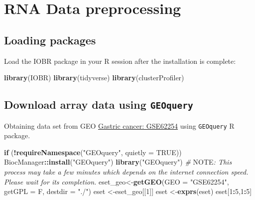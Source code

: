 \documentclass[
  12pt,
]{book}
\newenvironment{Shaded}{\begin{snugshade}}{\end{snugshade}}
\newcommand{\AlertTok}[1]{\textcolor[rgb]{0.94,0.16,0.16}{#1}}
\newcommand{\AttributeTok}[1]{\textcolor[rgb]{0.13,0.29,0.53}{#1}}
\newcommand{\CommentTok}[1]{\textcolor[rgb]{0.56,0.35,0.01}{\textit{#1}}}
\newcommand{\ConstantTok}[1]{\textcolor[rgb]{0.56,0.35,0.01}{#1}}
\newcommand{\ControlFlowTok}[1]{\textcolor[rgb]{0.13,0.29,0.53}{\textbf{#1}}}
\newcommand{\DecValTok}[1]{\textcolor[rgb]{0.00,0.00,0.81}{#1}}
\newcommand{\FunctionTok}[1]{\textcolor[rgb]{0.13,0.29,0.53}{\textbf{#1}}}
\newcommand{\NormalTok}[1]{#1}
\newcommand{\OtherTok}[1]{\textcolor[rgb]{0.56,0.35,0.01}{#1}}
\newcommand{\SpecialCharTok}[1]{\textcolor[rgb]{0.81,0.36,0.00}{\textbf{#1}}}
\newcommand{\StringTok}[1]{\textcolor[rgb]{0.31,0.60,0.02}{#1}}
\begin{document}
\hypertarget{rna-data-preprocessing}{%
\chapter{\texorpdfstring{\textbf{RNA Data preprocessing}}{RNA Data preprocessing}}\label{rna-data-preprocessing}}

\hypertarget{loading-packages}{%
\section{Loading packages}\label{loading-packages}}

Load the IOBR package in your R session after the installation is complete:

\begin{Shaded}
\begin{Highlighting}[]
\FunctionTok{library}\NormalTok{(IOBR)}
\FunctionTok{library}\NormalTok{(tidyverse)}
\FunctionTok{library}\NormalTok{(clusterProfiler)}
\end{Highlighting}
\end{Shaded}

\hypertarget{download-array-data-using-geoquery}{%
\section{\texorpdfstring{Download array data using \texttt{GEOquery}}{Download array data using GEOquery}}\label{download-array-data-using-geoquery}}

Obtaining data set from GEO \href{https://pubmed.ncbi.nlm.nih.gov/25894828/}{Gastric cancer: GSE62254} using \texttt{GEOquery} R package.

\begin{Shaded}
\begin{Highlighting}[]
\ControlFlowTok{if}\NormalTok{ (}\SpecialCharTok{!}\FunctionTok{requireNamespace}\NormalTok{(}\StringTok{"GEOquery"}\NormalTok{, }\AttributeTok{quietly =} \ConstantTok{TRUE}\NormalTok{))  BiocManager}\SpecialCharTok{::}\FunctionTok{install}\NormalTok{(}\StringTok{"GEOquery"}\NormalTok{)}
\FunctionTok{library}\NormalTok{(}\StringTok{"GEOquery"}\NormalTok{)}
\CommentTok{\# }\AlertTok{NOTE}\CommentTok{: This process may take a few minutes which depends on the internet connection speed. Please wait for its completion.}
\NormalTok{eset\_geo}\OtherTok{\textless{}{-}}\FunctionTok{getGEO}\NormalTok{(}\AttributeTok{GEO     =} \StringTok{"GSE62254"}\NormalTok{, }\AttributeTok{getGPL  =}\NormalTok{ F, }\AttributeTok{destdir =} \StringTok{"./"}\NormalTok{)}
\NormalTok{eset    }\OtherTok{\textless{}{-}}\NormalTok{eset\_geo[[}\DecValTok{1}\NormalTok{]]}
\NormalTok{eset    }\OtherTok{\textless{}{-}}\FunctionTok{exprs}\NormalTok{(eset)}
\NormalTok{eset[}\DecValTok{1}\SpecialCharTok{:}\DecValTok{5}\NormalTok{,}\DecValTok{1}\SpecialCharTok{:}\DecValTok{5}\NormalTok{]}
\end{Highlighting}
\end{Shaded}
\end{document}

